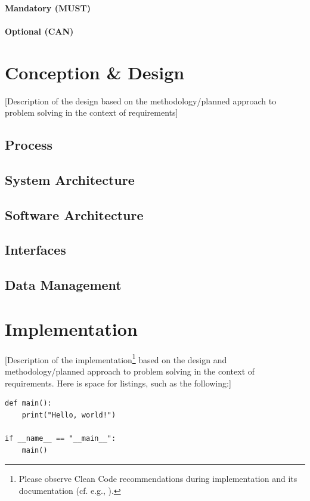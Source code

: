 \documentclass[oneside,12pt]{book}
\begin{document}
\subsubsection{Mandatory (MUST)}

\subsubsection{Optional (CAN)}

\chapter{Conception \& Design}
[Description of the design based on the methodology/planned approach to problem solving in the context of requirements]

\section{Process}

\section{System Architecture}

\section{Software Architecture}

\section{Interfaces}

\section{Data Management}

\chapter{Implementation}
[Description of the implementation\footnote{Please observe Clean Code recommendations during implementation and its documentation (cf. e.g., \cite{martin2008}).} based on the design and methodology/planned approach to problem solving in the context of requirements. Here is space for listings, such as the following:]

\begin{lstlisting}[caption={Example: Hello World (Python)}]
def main():
    print("Hello, world!")

if __name__ == "__main__":
    main()
\end{lstlisting}
\end{document}
